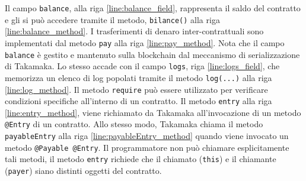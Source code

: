 Il campo \lstinline|balance|, alla riga \ref{line:balance_field}, rappresenta il saldo del contratto e gli si può accedere tramite il metodo, \lstinline|bilance()| alla riga \ref{line:balance_method}. I trasferimenti di denaro inter-contrattuali sono implementati dal metodo \lstinline|pay| alla riga \ref{line:pay_method}. Nota che il campo \lstinline|balance| è gestito e mantenuto sulla blockchain dal meccanismo di serializzazione di Takamaka. Lo stesso accade con il campo \lstinline|logs|, riga \ref{line:logs_field}, che memorizza un elenco di log popolati tramite il metodo \lstinline|log(...)| alla riga \ref{line:log_method}. Il metodo \lstinline|require| può essere utilizzato per verificare condizioni specifiche all'interno di un contratto. Il metodo \lstinline|entry| alla riga \ref{line:entry_method}, viene richiamato da Takamaka all'invocazione di un metodo \lstinline|@Entry| di un contratto. Allo stesso modo, Takamaka chiama il metodo \lstinline|payableEntry| alla riga \ref{line:payableEntry_method} quando viene invocato un metodo \lstinline|@Payable @Entry|. Il programmatore non può chiamare esplicitamente tali metodi, il metodo \lstinline|entry| richiede che il chiamato (\lstinline|this|) e il chiamante (\lstinline|payer|) siano distinti oggetti del contratto. 

